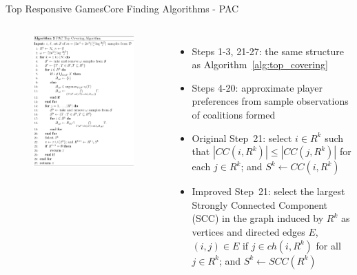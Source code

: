 \documentclass[xcolor=dvipsnames]{beamer}
\newcommand{\ch}{\mathit{ch}}
\newcommand{\CC}{\mathit{CC}}
\newcommand{\SCC}{\mathit{SCC}}
\begin{document}
\begin{frame}{Top Responsive Games}{Core Finding Algorithms - PAC}
  \begin{columns}
  \begin{figure}
    \includegraphics[width=\linewidth]{pac_top_cover}
  \end{figure}
  \begin{itemize}
    \scriptsize
    \item Steps 1-3, 21-27: the same structure as Algorithm~\ref{alg:top_covering}
    \item Steps 4-20: approximate player preferences from sample observations of coalitions formed
    \item Original \cite{ijcai2017-380} Step~21: select $i\in R^k$ such
                        that $|\CC(i,R^k)| \leq |\CC(j,R^k)|$ for each $j\in R^k$;
                        and $S^k\leftarrow \CC(i,R^k)$
    \item Improved Step~21: select the largest Strongly Connected Component (SCC)
                        in the graph induced by $R^k$ as vertices and directed edges $E$,
                        $(i, j) \in E$ if $j \in \ch(i, R^k)$ for all $j \in R^k$;
                        and $S^k\leftarrow \SCC(R^k)$
  \end{itemize}
  \end{columns}
\end{frame}
\end{document}
